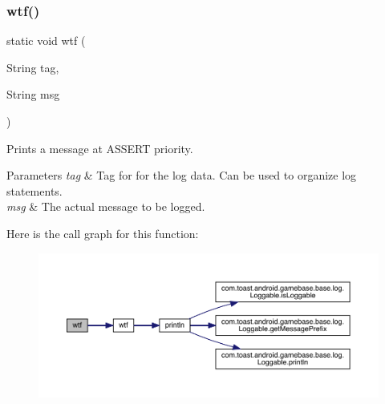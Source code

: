 \subsubsection{\texorpdfstring{wtf()}{wtf()}\hspace{0.1cm}{\footnotesize\ttfamily [2/3]}}
{\footnotesize\ttfamily static void wtf (\begin{DoxyParamCaption}\item[{String}]{tag,  }\item[{String}]{msg }\end{DoxyParamCaption})\hspace{0.3cm}{\ttfamily [static]}}



Prints a message at A\+S\+S\+E\+RT priority. 


\begin{DoxyParams}{Parameters}
{\em tag} & Tag for for the log data. Can be used to organize log statements. \\
\hline
{\em msg} & The actual message to be logged. \\
\hline
\end{DoxyParams}
Here is the call graph for this function\+:
\nopagebreak
\begin{figure}[H]
\begin{center}
\leavevmode
\includegraphics[width=350pt]{classcom_1_1toast_1_1android_1_1gamebase_1_1base_1_1log_1_1_logger_a1242f028963a420d7e3ccb4f5694a65f_cgraph}
\end{center}
\end{figure}
\mbox{\label{classcom_1_1toast_1_1android_1_1gamebase_1_1base_1_1log_1_1_logger_a3c834156048f909cd14a6244c0732fae}} 

